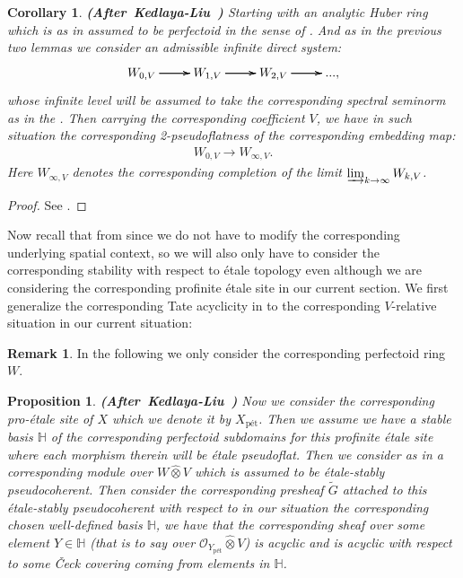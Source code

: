 \documentclass[12pt]{amsart}
\newtheorem{proposition}[theorem]{Proposition}
\newtheorem{corollary}[theorem]{Corollary}
\theoremstyle{definition}
\newtheorem{remark}[theorem]{Remark}
\numberwithin{equation}{section}
\begin{document}
\begin{corollary}\mbox{\bf{(After Kedlaya-Liu \cite[Corollary 3.4.5]{KL2})}} 
Starting with an analytic Huber ring which is as in \cite[Corollary 3.4.5]{KL2} assumed to be perfectoid in the sense of \cite[Definition 2.1.1]{Ked1}. And as in the previous two lemmas we consider an admissible infinite direct system:
\[
\xymatrix@C+0pc@R+0pc{
W_{0,V} \ar[r] \ar[r] \ar[r] &W_{1,V} \ar[r] \ar[r] \ar[r] &W_{2,V}  \ar[r] \ar[r] \ar[r] &...,   
}
\]
whose infinite level will be assumed to take the corresponding spectral seminorm as in the \cite[Corollary 3.4.5]{KL2}. Then carrying the corresponding coefficient $V$, we have in such situation the corresponding 2-pseudoflatness of the corresponding embedding map:
\begin{align}
W_{0,V}\rightarrow W_{\infty,V}.
\end{align}
Here $W_{\infty,V}$ denotes the corresponding completion of the limit $\varinjlim_{k\rightarrow\infty}W_{k,V}$.
\end{corollary}


\begin{proof}
See \cite[Corollary 3.4.5]{KL2}.	
\end{proof}





\indent Now recall that from \cite{KL2} since we do not have to modify the corresponding underlying spatial context, so we will also only have to consider the corresponding stability with respect to \'etale topology even although we are considering the corresponding profinite \'etale site in our current section. We first generalize the corresponding Tate acyclicity in \cite{KL2} to the corresponding $V$-relative situation in our current situation:




\begin{remark}
In the following we only consider the corresponding perfectoid ring $W$.	
\end{remark}




\begin{proposition}\mbox{\bf{(After Kedlaya-Liu \cite[Theorem 3.4.6]{KL2})}} 
Now we consider the corresponding pro-\'etale site of $X$ which we denote it by $X_\text{p\'et}$. Then we assume we have a stable basis $\mathbb{H}$ of the corresponding perfectoid subdomains for this profinite \'etale site where each morphism therein will be \'etale pseudoflat. Then we consider as in \cite[Theorem 3.4.6]{KL2} a corresponding module over $W\widehat{\otimes}V$ which is assumed to be \'etale-stably pseudocoherent. Then consider the corresponding presheaf $\widetilde{G}$ attached to this \'etale-stably pseudocoherent with respect to in our situation the corresponding chosen well-defined basis $\mathbb{H}$, we have that the corresponding sheaf over some element $Y\in \mathbb{H}$ (that is to say over $\mathcal{O}_{Y_\text{p\'et}}\widehat{\otimes}V$) is acyclic and is acyclic with respect to some \v{C}eck covering coming from elements in $\mathbb{H}$. 
\end{proposition}
\end{document}
